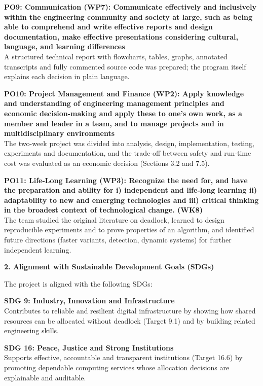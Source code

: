 \documentclass[11pt,a4paper]{report}
\begin{document}
\bigskip
\noindent\textbf{PO9: Communication (WP7): Communicate effectively and inclusively within the engineering community and society at large, such as being able to comprehend and write effective reports and design documentation, make effective presentations considering cultural, language, and learning differences}\\
A structured technical report with flowcharts, tables, graphs, annotated transcripts and fully commented source code was prepared; the program itself explains each decision in plain language.

\bigskip
\noindent\textbf{PO10: Project Management and Finance (WP2): Apply knowledge and understanding of engineering management principles and economic decision-making and apply these to one's own work, as a member and leader in a team, and to manage projects and in multidisciplinary environments}\\
The two-week project was divided into analysis, design, implementation, testing, experiments and documentation, and the trade-off between safety and run-time cost was evaluated as an economic decision (Sections 3.2 and 7.5).

\bigskip
\noindent\textbf{PO11: Life-Long Learning (WP3): Recognize the need for, and have the preparation and ability for i) independent and life-long learning ii) adaptability to new and emerging technologies and iii) critical thinking in the broadest context of technological change. (WK8)}\\
The team studied the original literature on deadlock, learned to design reproducible experiments and to prove properties of an algorithm, and identified future directions (faster variants, detection, dynamic systems) for further independent learning.

\bigskip
\noindent\textbf{2. Alignment with Sustainable Development Goals (SDGs)}

The project is aligned with the following SDGs:

\bigskip
\noindent\textbf{SDG 9: Industry, Innovation and Infrastructure}\\
Contributes to reliable and resilient digital infrastructure by showing how shared resources can be allocated without deadlock (Target 9.1) and by building related engineering skills.

\bigskip
\noindent\textbf{SDG 16: Peace, Justice and Strong Institutions}\\
Supports effective, accountable and transparent institutions (Target 16.6) by promoting dependable computing services whose allocation decisions are explainable and auditable.
\end{document}
